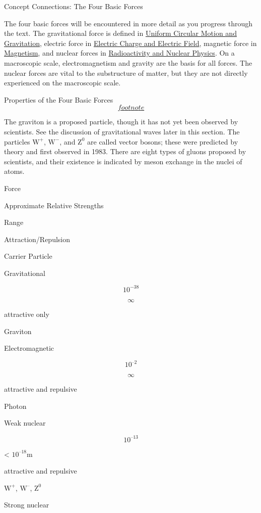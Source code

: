 \documentclass[
]{book}
\begin{document}
\hypertarget{fs-id3025368}{}
Concept Connections: The Four Basic Forces

The four basic forces will be encountered in more detail as you progress
through the text. The gravitational force is defined in \href{/m54986}{Uniform
Circular Motion and Gravitation}, electric force in \href{/m55297}{Electric
Charge and Electric Field}, magnetic force in
\href{/m55372}{Magnetism}, and nuclear forces in \href{/m54935}{Radioactivity and Nuclear
Physics}. On a macroscopic scale, electromagnetism and gravity
are the basis for all forces. The nuclear forces are vital to the
substructure of matter, but they are not directly experienced on the
macroscopic scale.

{Properties of the Four Basic
Forces\protect\hyperlink{eip-id1997179}{\[footnote\]}}

The graviton is a proposed particle, though it has not yet been observed
by scientists. See the discussion of gravitational waves later in this
section. The particles \(\text{W}^{+}{}\), \(\text{W}^{-}{}\), and
\(\text{Z}^{0}{}\) are called vector bosons; these were predicted by
theory and first observed in 1983. There are eight types of gluons
proposed by scientists, and their existence is indicated by meson
exchange in the nuclei of atoms.

Force

Approximate Relative Strengths

Range

Attraction/Repulsion

Carrier Particle

Gravitational

\[\text{10}^{- \text{38}}{}\]

\[\infty{}\]

attractive only

Graviton

Electromagnetic

\[\text{10}^{–2}{}\]

\[\infty{}\]

attractive and repulsive

Photon

Weak nuclear

\[\text{10}^{–\text{13}}\]

\textless{} \(10^{–18}\text{m}\)

attractive and repulsive

\(\text{W}^{+}{}\), \(\text{W}^{–}{}\), \(\text{Z}^{0}{}\)

Strong nuclear
\end{document}

